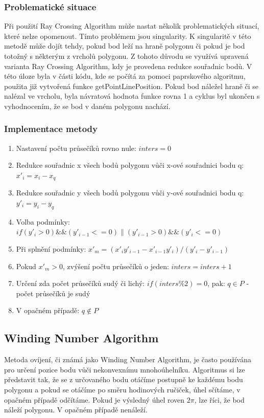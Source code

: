 \documentclass[a4paper, 12pt]{article}
\begin{document}
\subsubsection{Problematické situace}
Při použití Ray Crossing Algorithm může nastat několik problematických situací, které nelze opomenout. Tímto problémem jsou singularity. K singularitě v této metodě může dojít tehdy, pokud bod leží na hraně polygonu či pokud je bod totožný s některým z vrcholů polygonu. Z tohoto důvodu se využívá upravená varianta Ray Crossing Algorithm, kdy je provedena redukce souřadnic bodů. V této úloze byla v části kódu, kde se počítá za pomoci paprskového algoritmu, použita již vytvořená funkce getPointLinePosition. Pokud bod náležel hraně či se nalézal ve vrcholu, byla návratová hodnota funkce rovna 1 a cyklus byl ukončen s vyhodnocením, že se bod v daném polygonu nachází.

\subsubsection{Implementace metody}
\begin{enumerate}
\item Nastavení počtu průsečíků rovno nule:  $ inters = 0 $ 
\item Redukce souřadnic x všech bodů polygonu vůči x-ové souřadnici bodu q:  $x'_i = x_i - x_q $ 
\item Redukce souřadnic y všech bodů polygonu vůči y-ové souřadnici bodu q:  $y'_i = y_i - y_q $ 
\item Volba podmínky:  $if(y'_i > 0)\&\&(y'_{i-1} <= 0)\|(y'_{i-1} > 0)\&\&(y'_{i} <= 0)  $ 
\item Při splnění podmínky:  $ x'_m = (x'_i y'_{i-1} - x'_{i-1} y'_i ) / (y'_i - y'_{i-1})$ 
\item Pokud $x'_m > 0$, zvýšení počtu průsečíků o jeden: $ inters = inters + 1 $
\item Určení zda počet průsečíků sudý či lichý: $if (inters\%2) = 0$, pak: $q\in P$ - počet průsečíků je sudý
\item V opačném případě: $q {\not \in} P$
\end{enumerate}

\subsection{Winding Number Algorithm}
Metoda ovíjení, či známá jako Winding Number Algorithm, je často používána pro určení pozice bodu vůči nekonvexnímu mnohoúhelníku. Algoritmus si lze představit tak, že se z určovaného bodu otáčíme postupně ke každému bodu polygonu a pokud se otáčíme po směru hodinových ručiček, úhel sčítáme, v opačném případě odčítáme. Pokud je výsledný úhel roven $2\pi$, lze říci, že bod náleží polygonu. V opačném případě nenáleží.
\end{document}
